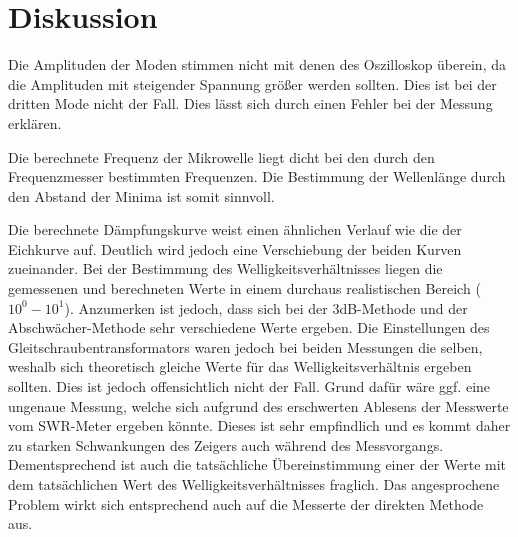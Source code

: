 \section{Diskussion}
\label{sec:Diskussion}
Die Amplituden der Moden stimmen nicht mit denen des Oszilloskop überein, da die
Amplituden mit steigender Spannung größer werden sollten. Dies ist bei der
dritten Mode nicht der Fall. Dies lässt sich durch einen Fehler bei der Messung erklären.

Die berechnete Frequenz der Mikrowelle liegt dicht bei den durch den Frequenzmesser
bestimmten Frequenzen. Die Bestimmung der Wellenlänge durch den Abstand der Minima
ist somit sinnvoll.

Die berechnete Dämpfungskurve weist einen ähnlichen Verlauf wie die der Eichkurve auf.
Deutlich wird jedoch eine Verschiebung der beiden Kurven zueinander.
Bei der Bestimmung des Welligkeitsverhältnisses liegen die gemessenen und berechneten
Werte in einem durchaus realistischen Bereich ($10^0 - 10^1$). Anzumerken ist jedoch,
dass sich bei der 3dB-Methode und der Abschwächer-Methode sehr verschiedene Werte
ergeben. Die Einstellungen des Gleitschraubentransformators waren jedoch bei beiden
Messungen die selben, weshalb sich theoretisch gleiche Werte für das Welligkeitsverhältnis
ergeben sollten. Dies ist jedoch offensichtlich nicht der Fall. Grund dafür wäre ggf.
eine ungenaue Messung, welche sich aufgrund des erschwerten Ablesens der
Messwerte vom SWR-Meter ergeben könnte. Dieses ist sehr empfindlich und es kommt
daher zu starken Schwankungen des Zeigers auch während des Messvorgangs.
Dementsprechend ist auch die tatsächliche Übereinstimmung einer der Werte mit
dem tatsächlichen Wert des Welligkeitsverhältnisses fraglich. Das angesprochene
Problem wirkt sich entsprechend auch auf die Messerte der direkten Methode aus.
